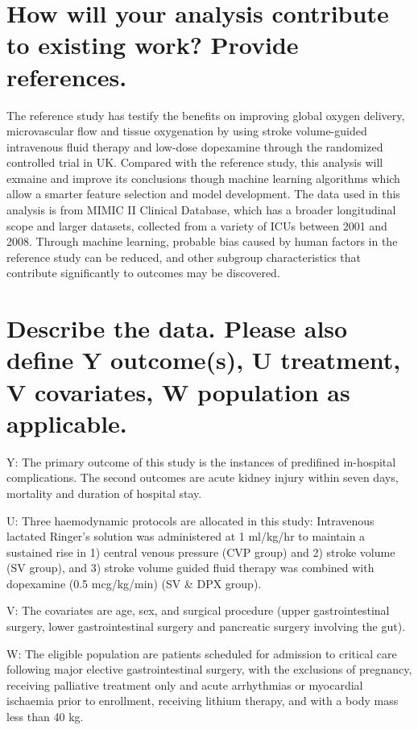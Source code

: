 \documentclass[twoside,10.5pt]{article}
\begin{document}
\section{How will your analysis contribute to existing work? Provide references.}

The reference study has testify the benefits on improving global oxygen delivery, microvascular flow and tissue oxygenation by using stroke volume-guided intravenous fluid therapy and low-dose dopexamine through the randomized controlled trial in UK. Compared with the reference study, this analysis will exmaine and improve its conclusions though machine learning algorithms which allow a smarter feature selection and model development. The data used in this analysis is from MIMIC II Clinical Database, which has a broader longitudinal scope and larger datasets, collected from a variety of ICUs between 2001 and 2008. Through machine learning, probable bias caused by human factors in the reference study can be reduced, and other subgroup characteristics that contribute significantly to outcomes may be discovered.

\section{Describe the data. Please also define Y outcome(s), U treatment, V covariates, W population as applicable.}

Y: The primary outcome of this study is the instances of predifined in-hospital complications. The second outcomes are acute kidney injury within seven days, mortality and duration of hospital stay.

U: Three haemodynamic protocols are allocated in this study: Intravenous lactated Ringer’s solution was administered at 1 ml/kg/hr to maintain a sustained rise in 1) central venous pressure (CVP group) and 2) stroke volume (SV group), and 3) stroke volume guided fluid therapy was combined with dopexamine (0.5 mcg/kg/min) (SV \& DPX group).

V: The covariates are age, sex, and surgical procedure (upper gastrointestinal surgery, lower gastrointestinal surgery and pancreatic surgery involving the gut).

W: The eligible population are patients scheduled for admission to critical care following major elective gastrointestinal surgery, with the exclusions of pregnancy, receiving palliative treatment only and acute arrhythmias or myocardial ischaemia prior to enrollment, receiving lithium therapy, and with a body mass less than 40 kg.
\end{document}
